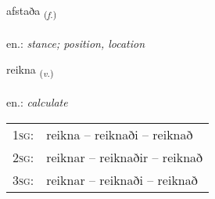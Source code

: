 \documentclass[frontgrid, backgrid]{flacards}\usepackage[]{graphicx}\usepackage[]{xcolor}
\begin{document}
\renewcommand{\blhead}{\vskip5pt {\small\bfseries\footnotesize Nafnorð | Noun }}
\renewcommand{\bcfoot}{\vskip5pt \hspace{2pt}{\small\bfseries\footnotesize 1K}}


{afstaða \small{\textsubscript{(\textit{f.})}} \\[1ex] %
\textphonetic{[afstaða]} \\
en.: \emph{stance; position, location} \\  [2ex]
\renewcommand*{\arraystretch}{0.8}
}

\renewcommand{\flhead}{\vskip5pt \fboxsep=0pt {\small\bfseries\footnotesize Sagnorð | Verb}}
\renewcommand{\fcfoot}{\vskip5pt \fboxsep=0pt \hspace{2pt}{\small\bfseries\footnotesize 1K}}

\renewcommand{\blhead}{\vskip5pt {\small\bfseries\footnotesize Sagnorð | Verb }}
\renewcommand{\bcfoot}{\vskip5pt \hspace{2pt}{\small\bfseries\footnotesize 1K}}


{reikna \small{\textsubscript{(\textit{v.})}} \\[1ex] %
\textphonetic{[reihkna]} \\
en.: \emph{calculate} \\  [2ex]
\renewcommand*{\arraystretch}{0.8}
\begin{tabular}{p{1cm}l}
\textsc{1sg}: & reikna -- reiknaði -- reiknað \\ 
\textsc{2sg}: & reiknar -- reiknaðir -- reiknað \\ 
\textsc{3sg}: & reiknar -- reiknaði -- reiknað \\ 
\end{tabular}
}
\end{document}
